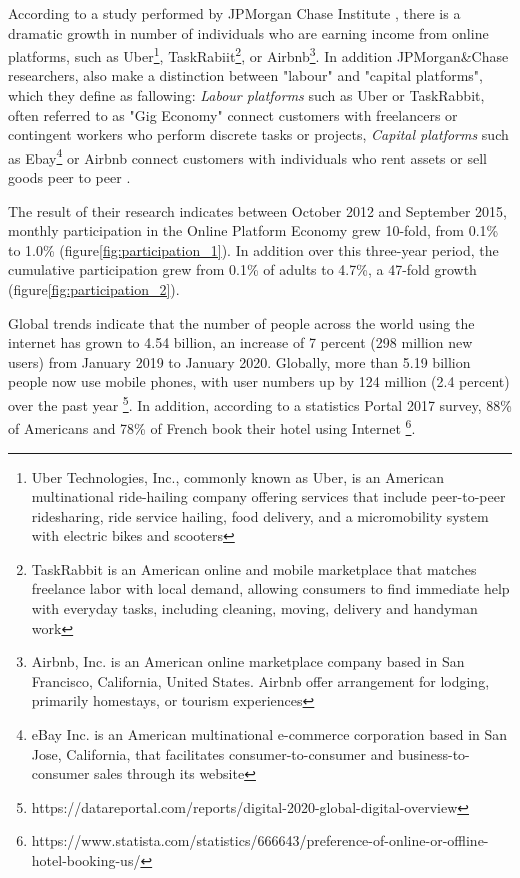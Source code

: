 According to a study performed by JPMorgan Chase Institute \cite{jpmorgan_2016} , there is a dramatic growth in number of individuals who are earning income from online platforms, such as Uber\footnote{Uber Technologies, Inc., commonly known as Uber, is an American multinational ride-hailing company offering services that include peer-to-peer ridesharing, ride service hailing, food delivery, and a micromobility system with electric bikes and scooters}, TaskRabiit\footnote{TaskRabbit is an American online and mobile marketplace that matches freelance labor with local demand, allowing consumers to find immediate help with everyday tasks, including cleaning, moving, delivery and handyman work}, or Airbnb\footnote{Airbnb, Inc. is an American online marketplace company based in San Francisco, California, United States. Airbnb offer arrangement for lodging, primarily homestays, or tourism experiences}.
In addition JPMorgan\&Chase researchers, also make a distinction between "labour" and "capital platforms", which they define as fallowing:
\textit{Labour platforms} such as Uber or TaskRabbit, often referred to as "Gig Economy" connect customers with freelancers or contingent workers who perform discrete tasks or projects,
\textit{Capital platforms} such as Ebay\footnote{eBay Inc. is an American multinational e-commerce corporation based in San Jose, California, that facilitates consumer-to-consumer and business-to-consumer sales through its website} or Airbnb connect customers with individuals who rent assets or sell goods peer to peer \cite{jpmorgan_2016}.

The result of their research indicates between October 2012 and September 2015, monthly participation in the Online Platform Economy grew 10-fold, from 0.1\% to 1.0\% (figure\ref{fig:participation_1}). In addition over this three-year period, the cumulative participation grew from 0.1\% of adults to 4.7\%, a 47-fold growth (figure\ref{fig:participation_2}). 


Global trends indicate that the number of people across the world using the internet has grown to 4.54 billion, an increase of 7 percent (298 million new users) from January 2019 to January 2020. Globally, more than 5.19 billion people now use mobile phones, with user numbers up by 124 million (2.4 percent) over the past year \footnote{https://datareportal.com/reports/digital-2020-global-digital-overview}. In addition, according to a statistics Portal 2017 survey, 88\% of Americans and 78\%  of French book their hotel using Internet \footnote{https://www.statista.com/statistics/666643/preference-of-online-or-offline-hotel-booking-us/}. 

